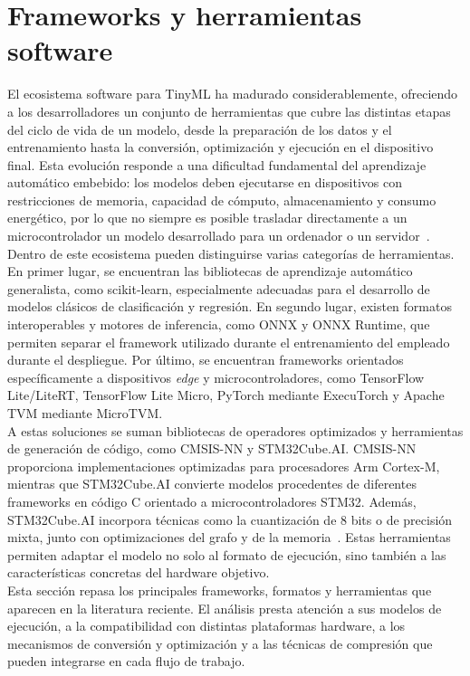 \documentclass[a4paper,12pt,twoside,final]{book}
\begin{document}
\section{Frameworks y herramientas software}
El ecosistema software para TinyML ha madurado considerablemente, ofreciendo a los desarrolladores un conjunto de
herramientas que cubre las distintas etapas del ciclo de vida de un modelo, desde la preparación de los datos y el
entrenamiento hasta la conversión, optimización y ejecución en el dispositivo final. Esta evolución responde a una
dificultad fundamental del aprendizaje automático embebido: los modelos deben ejecutarse en dispositivos con
restricciones de memoria, capacidad de cómputo, almacenamiento y consumo energético, por lo que no siempre es
posible trasladar directamente a un microcontrolador un modelo desarrollado para un ordenador o un
servidor~\cite{ray2022kingsaud}.\\

Dentro de este ecosistema pueden distinguirse varias categorías de herramientas. En primer lugar, se encuentran las
bibliotecas de aprendizaje automático generalista, como scikit-learn, especialmente adecuadas para el desarrollo de
modelos clásicos de clasificación y regresión. En segundo lugar, existen formatos interoperables y motores de
inferencia, como ONNX y ONNX Runtime, que permiten separar el framework utilizado durante el entrenamiento del
empleado durante el despliegue. Por último, se encuentran frameworks orientados específicamente a dispositivos
\textit{edge} y microcontroladores, como TensorFlow Lite/LiteRT, TensorFlow Lite Micro, PyTorch mediante ExecuTorch
y Apache TVM mediante MicroTVM.\\

A estas soluciones se suman bibliotecas de operadores optimizados y herramientas de generación de código, como
CMSIS-NN y STM32Cube.AI. CMSIS-NN proporciona implementaciones optimizadas para procesadores Arm Cortex-M, mientras
que STM32Cube.AI convierte modelos procedentes de diferentes frameworks en código C orientado a microcontroladores
STM32. Además, STM32Cube.AI incorpora técnicas como la cuantización de 8 bits o de precisión mixta, junto con
optimizaciones del grafo y de la memoria~\cite{hasanpour2025sysarc}. Estas herramientas permiten adaptar el modelo
no solo al formato de ejecución, sino también a las características concretas del hardware objetivo.\\

Esta sección repasa los principales frameworks, formatos y herramientas que aparecen en la literatura reciente. El
análisis presta atención a sus modelos de ejecución, a la compatibilidad con distintas plataformas hardware, a los
mecanismos de conversión y optimización y a las técnicas de compresión que pueden integrarse en cada flujo de
trabajo.\\
\end{document}
